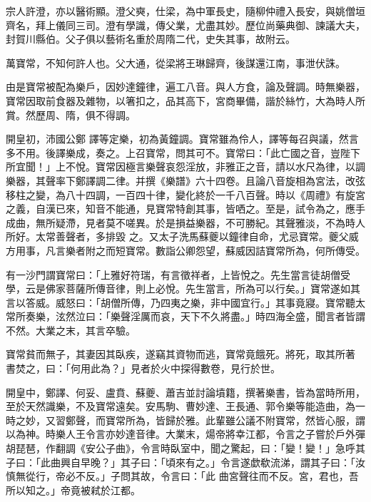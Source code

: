 \begin{pinyinscope}
 宗人許澄，亦以醫術顯。澄父奭，仕梁，為中軍長史，隨柳仲禮入長安，與姚僧垣齊名，拜上儀同三司。澄有學識，傳父業，尤盡其妙。歷位尚藥典御、諫議大夫，封賀川縣伯。父子俱以藝術名重於周隋二代，史失其事，故附云。



 萬寶常，不知何許人也。父大通，從梁將王琳歸齊，後謀還江南，事泄伏誅。



 由是寶常被配為樂戶，因妙達鐘律，遍工八音。與人方食，論及聲調。時無樂器，寶常因取前食器及雜物，以箸扣之，品其高下，宮商畢備，諧於絲竹，大為時人所賞。然歷周、隋，俱不得調。



 開皇初，沛國公鄭
 譯等定樂，初為黃鐘調。寶常雖為伶人，譯等每召與議，然言多不用。後譯樂成，奏之。上召寶常，問其可不。寶常曰：「此亡國之音，豈陛下所宜聞！」上不悅。寶常因極言樂聲哀怨淫放，非雅正之音，請以水尺為律，以調樂器，其聲率下鄭譯調二律。并撰《樂譜》六十四卷。且論八音旋相為宮法，改弦移柱之變，為八十四調，一百四十律，變化終於一千八百聲。時以《周禮》有旋宮之義，自漢已來，知音不能通，見寶常特創其事，皆哂之。至是，試令為之，應手成曲，無所疑滯，見者莫不嗟異。於是損益樂器，不可勝紀。其聲雅淡，不為時人所好。太常善聲者，多排毀
 之。又太子洗馬蘇夔以鐘律自命，尤忌寶常。夔父威方用事，凡言樂者附之而短寶常。數詣公卿怨望，蘇威因詰寶常所為，何所傳受。



 有一沙門謂寶常曰：「上雅好符瑞，有言徵祥者，上皆悅之。先生當言徒胡僧受學，云是佛家菩薩所傳音律，則上必悅。先生當言，所為可以行矣。」寶常遂如其言以答威。威怒曰：「胡僧所傳，乃四夷之樂，非中國宜行。」其事竟寢。寶常聽太常所奏樂，泫然泣曰：「樂聲淫厲而哀，天下不久將盡。」時四海全盛，聞言者皆謂不然。大業之末，其言卒驗。



 寶常貧而無子，其妻因其臥疾，遂竊其資物而逃，寶常竟餓死。將死，取其所著
 書焚之，曰：「何用此為？」見者於火中探得數卷，見行於世。



 開皇中，鄭譯、何妥、盧賁、蘇夔、蕭吉並討論墳籍，撰著樂書，皆為當時所用，至於天然識樂，不及寶常遠矣。安馬駒、曹妙達、王長通、郭令樂等能造曲，為一時之妙，又習鄭聲，而寶常所為，皆歸於雅。此輩雖公議不附寶常，然皆心服，謂以為神。時樂人王令言亦妙達音律。大業末，煬帝將幸江都，令言之子嘗於戶外彈胡琵琶，作翻調《安公子曲》，令言時臥室中，聞之驚起，曰：「變！變！」急呼其子曰：「此曲興自早晚？」其子曰：「頃來有之。」令言遂歔欷流涕，謂其子曰：「汝慎無從行，帝必不反。」子問其故，令言曰：「此
 曲宮聲往而不反。宮，君也，吾所以知之。」帝竟被弒於江都。




\end{pinyinscope}
